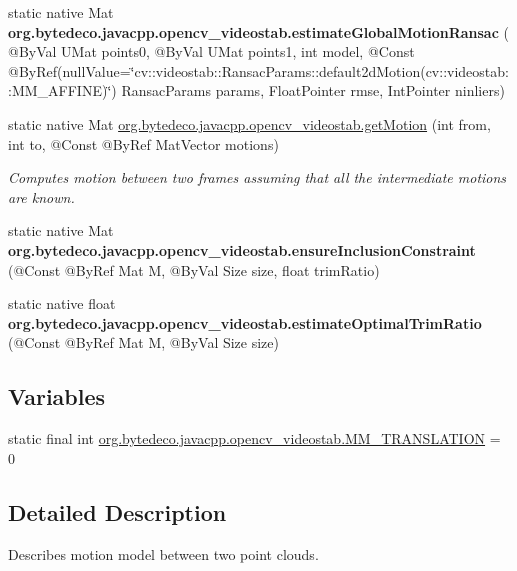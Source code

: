 \begin{DoxyCompactItemize}
\item 
\mbox{\label{group__videostab__motion_ga891cadc59e1dffa32c5978b0975c3c05}} 
static native Mat {\bfseries org.\+bytedeco.\+javacpp.\+opencv\+\_\+videostab.\+estimate\+Global\+Motion\+Ransac} ( @By\+Val U\+Mat points0, @By\+Val U\+Mat points1, int model, @Const @By\+Ref(null\+Value=\char`\"{}cv\+::videostab\+::\+Ransac\+Params\+::default2d\+Motion(cv\+::videostab\+::\+M\+M\+\_\+\+A\+F\+F\+I\+NE)\char`\"{}) Ransac\+Params params, Float\+Pointer rmse, Int\+Pointer ninliers)
\item 
static native Mat \hyperlink{group__videostab__motion_ga1e73edce6a2ac4dee3f6a1ae7ec06d26}{org.\+bytedeco.\+javacpp.\+opencv\+\_\+videostab.\+get\+Motion} (int from, int to, @Const @By\+Ref Mat\+Vector motions)
\begin{DoxyCompactList}\small\item\em Computes motion between two frames assuming that all the intermediate motions are known. \end{DoxyCompactList}\item 
\mbox{\label{group__videostab__motion_ga00ba769b01cfd9a14db5b9c9188f46bd}} 
static native Mat {\bfseries org.\+bytedeco.\+javacpp.\+opencv\+\_\+videostab.\+ensure\+Inclusion\+Constraint} (@Const @By\+Ref Mat M, @By\+Val Size size, float trim\+Ratio)
\item 
\mbox{\label{group__videostab__motion_ga7e7af6ff24512247873b71dfaa184bbb}} 
static native float {\bfseries org.\+bytedeco.\+javacpp.\+opencv\+\_\+videostab.\+estimate\+Optimal\+Trim\+Ratio} (@Const @By\+Ref Mat M, @By\+Val Size size)
\end{DoxyCompactItemize}
\subsection*{Variables}
\begin{DoxyCompactItemize}
\item 
static final int \hyperlink{group__videostab__motion_ga1dfde997ecf6b23eb737a2b7461597cf}{org.\+bytedeco.\+javacpp.\+opencv\+\_\+videostab.\+M\+M\+\_\+\+T\+R\+A\+N\+S\+L\+A\+T\+I\+ON} = 0
\end{DoxyCompactItemize}


\subsection{Detailed Description}
Describes motion model between two point clouds. 

